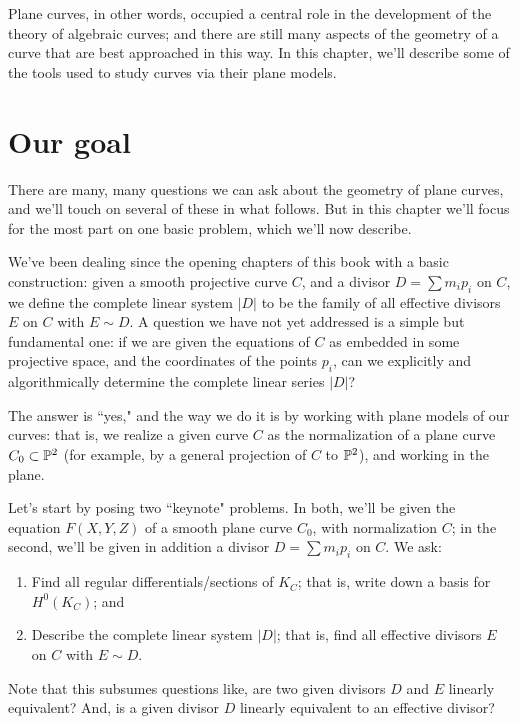 Plane curves, in other words, occupied a central role in the development of the theory of algebraic curves; and there are still many aspects of the geometry of a curve that are best approached in this way. In this chapter, we'll describe some of the tools used to study  curves via their plane models.

\section{Our goal}

There are many, many questions we can ask about the geometry of plane curves, and we'll touch on several of these in what follows. But in this chapter we'll focus for the most part on one basic problem, which we'll now describe.

We've been dealing since the opening chapters of this book with a basic construction: given a smooth projective curve $C$, and a divisor $D =  \sum m_ip_i$ on $C$, we define the complete linear system $|D|$ to be the family of all effective divisors $E$ on $C$ with $E \sim D$. A question we have not yet addressed  is a simple but fundamental one: if we are given the equations of $C$ as embedded in some projective space, and the coordinates of the points $p_i$, can we explicitly and algorithmically determine the complete linear series $|D|$?

The answer is ``yes," and the way we do it is by working with plane models of our curves: that is, we realize a given curve $C$ as the normalization of a plane curve $C_0 \subset {\mathbb P}^2$ (for example, by a general projection of $C$ to ${\mathbb P}^2$), and working in the plane. 

Let's start by posing two ``keynote" problems. In both, we'll be given the equation $F(X,Y,Z)$ of a smooth plane curve $C_0$, with normalization $C$; in the second, we'll be given in addition a divisor $D = \sum m_ip_i$ on $C$. We ask:
\begin{enumerate}
\item Find all regular differentials/sections of $K_C$; that is, write down a basis for $H^0(K_C)$; and
\item Describe the complete linear system $|D|$; that is, find all effective divisors $E$ on $C$ with $E \sim D$.
\end{enumerate}

Note that this subsumes questions like, are two given divisors $D$ and $E$ linearly equivalent? And, is a given divisor $D$ linearly equivalent to an effective divisor? 

